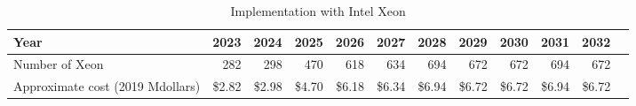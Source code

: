 \tiny \begin{longtable} { |p{}  |r  |r  |r  |r  |r  |r  |r  |r  |r  |r  |r |} 
\caption{Implementation with Intel Xeon \label{tab:opsXeon}}\\ 
\hline 
\textbf{Year}&\textbf{2023}&\textbf{2024}&\textbf{2025}&\textbf{2026}&\textbf{2027}&\textbf{2028}&\textbf{2029}&\textbf{2030}&\textbf{2031}&\textbf{2032} \\ \hline
{Number of Xeon}&{282}&{298}&{470}&{618}&{634}&{694}&{672}&{672}&{694}&{672} \\ \hline
{Approximate cost (2019 Mdollars)}&{\$2.82}&{\$2.98}&{\$4.70}&{\$6.18}&{\$6.34}&{\$6.94}&{\$6.72}&{\$6.72}&{\$6.94}&{\$6.72} \\ \hline
\end{longtable} \normalsize
